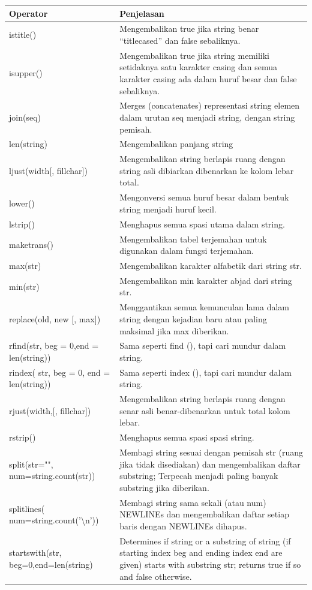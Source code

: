 \begin{center}
\begin{tabular}{ | m{3cm} | m{7cm} | }
\hline
Operator & Penjelasan \\
\hline
istitle() & Mengembalikan true jika string benar “titlecased” dan false sebaliknya. \\
\hline
isupper() & Mengembalikan true jika string memiliki setidaknya satu karakter casing dan semua karakter casing ada dalam huruf besar dan false sebaliknya. \\
\hline
join(seq) & Merges (concatenates) representasi string elemen dalam urutan seq menjadi string, dengan string pemisah. \\
\hline
len(string) & Mengembalikan panjang string \\
\hline
ljust(width[, fillchar]) & Mengembalikan string berlapis ruang dengan string asli dibiarkan dibenarkan ke kolom lebar total. \\
\hline
lower() & Mengonversi semua huruf besar dalam bentuk string menjadi huruf kecil. \\
\hline
lstrip() & Menghapus semua spasi utama dalam string. \\
\hline
maketrans() & Mengembalikan tabel terjemahan untuk digunakan dalam fungsi terjemahan. \\
\hline
max(str) & Mengembalikan karakter alfabetik dari string str. \\
\hline
min(str) & Mengembalikan min karakter abjad dari string str. \\
\hline
replace(old, new [, max]) & Menggantikan semua kemunculan lama dalam string dengan kejadian baru atau paling maksimal jika max diberikan. \\
\hline
rfind(str, beg = 0,end = len(string)) & Sama seperti find (), tapi cari mundur dalam string. \\
\hline
rindex( str, beg = 0, end = len(string)) & Sama seperti index (), tapi cari mundur dalam string. \\
\hline
rjust(width,[, fillchar]) & Mengembalikan string berlapis ruang dengan senar asli benar-dibenarkan untuk total kolom lebar. \\
\hline
rstrip() & Menghapus semua spasi spasi string. \\
\hline
split(str="", num=string.count(str)) & Membagi string sesuai dengan pemisah str (ruang jika tidak disediakan) dan mengembalikan daftar substring; Terpecah menjadi paling banyak substring jika diberikan. \\
\hline
splitlines( num=string.count('\textbackslash n')) & Membagi string sama sekali (atau num) NEWLINEs dan mengembalikan daftar setiap baris dengan NEWLINEs dihapus. \\
\hline
startswith(str, beg=0,end=len(string) & Determines if string or a substring of string (if starting index beg and ending index end are given) starts with substring str; returns true if so and false otherwise. \\
\hline
\end{tabular}
\end{center}

